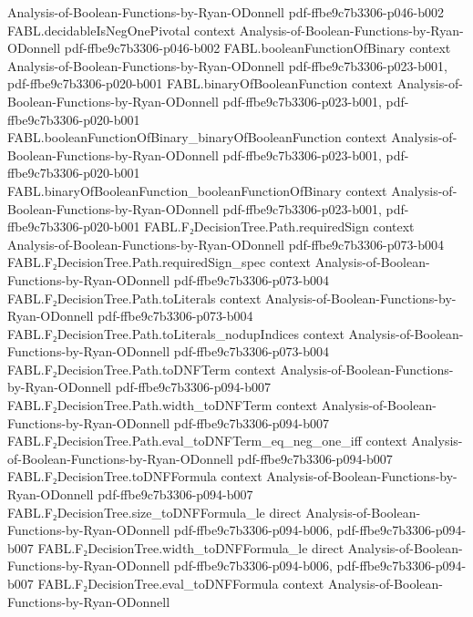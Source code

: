 \begin{theorem}
  {Analysis-of-Boolean-Functions-by-Ryan-ODonnell}
  {pdf-ffbe9c7b3306-p046-b002}
\proofstep
  {FABL.decidableIsNegOnePivotal}
  {context}
  {Analysis-of-Boolean-Functions-by-Ryan-ODonnell}
  {pdf-ffbe9c7b3306-p046-b002}
\proofstep
  {FABL.booleanFunctionOfBinary}
  {context}
  {Analysis-of-Boolean-Functions-by-Ryan-ODonnell}
  {pdf-ffbe9c7b3306-p023-b001,
    pdf-ffbe9c7b3306-p020-b001}
\proofstep
  {FABL.binaryOfBooleanFunction}
  {context}
  {Analysis-of-Boolean-Functions-by-Ryan-ODonnell}
  {pdf-ffbe9c7b3306-p023-b001,
    pdf-ffbe9c7b3306-p020-b001}
\proofstep
  {FABL.booleanFunctionOfBinary_binaryOfBooleanFunction}
  {context}
  {Analysis-of-Boolean-Functions-by-Ryan-ODonnell}
  {pdf-ffbe9c7b3306-p023-b001,
    pdf-ffbe9c7b3306-p020-b001}
\proofstep
  {FABL.binaryOfBooleanFunction_booleanFunctionOfBinary}
  {context}
  {Analysis-of-Boolean-Functions-by-Ryan-ODonnell}
  {pdf-ffbe9c7b3306-p023-b001,
    pdf-ffbe9c7b3306-p020-b001}
\proofstep
  {FABL.F₂DecisionTree.Path.requiredSign}
  {context}
  {Analysis-of-Boolean-Functions-by-Ryan-ODonnell}
  {pdf-ffbe9c7b3306-p073-b004}
\proofstep
  {FABL.F₂DecisionTree.Path.requiredSign_spec}
  {context}
  {Analysis-of-Boolean-Functions-by-Ryan-ODonnell}
  {pdf-ffbe9c7b3306-p073-b004}
\proofstep
  {FABL.F₂DecisionTree.Path.toLiterals}
  {context}
  {Analysis-of-Boolean-Functions-by-Ryan-ODonnell}
  {pdf-ffbe9c7b3306-p073-b004}
\proofstep
  {FABL.F₂DecisionTree.Path.toLiterals_nodupIndices}
  {context}
  {Analysis-of-Boolean-Functions-by-Ryan-ODonnell}
  {pdf-ffbe9c7b3306-p073-b004}
\proofstep
  {FABL.F₂DecisionTree.Path.toDNFTerm}
  {context}
  {Analysis-of-Boolean-Functions-by-Ryan-ODonnell}
  {pdf-ffbe9c7b3306-p094-b007}
\proofstep
  {FABL.F₂DecisionTree.Path.width_toDNFTerm}
  {context}
  {Analysis-of-Boolean-Functions-by-Ryan-ODonnell}
  {pdf-ffbe9c7b3306-p094-b007}
\proofstep
  {FABL.F₂DecisionTree.Path.eval_toDNFTerm_eq_neg_one_iff}
  {context}
  {Analysis-of-Boolean-Functions-by-Ryan-ODonnell}
  {pdf-ffbe9c7b3306-p094-b007}
\proofstep
  {FABL.F₂DecisionTree.toDNFFormula}
  {context}
  {Analysis-of-Boolean-Functions-by-Ryan-ODonnell}
  {pdf-ffbe9c7b3306-p094-b007}
\proofstep
  {FABL.F₂DecisionTree.size_toDNFFormula_le}
  {direct}
  {Analysis-of-Boolean-Functions-by-Ryan-ODonnell}
  {pdf-ffbe9c7b3306-p094-b006,
    pdf-ffbe9c7b3306-p094-b007}
\proofstep
  {FABL.F₂DecisionTree.width_toDNFFormula_le}
  {direct}
  {Analysis-of-Boolean-Functions-by-Ryan-ODonnell}
  {pdf-ffbe9c7b3306-p094-b006,
    pdf-ffbe9c7b3306-p094-b007}
\proofstep
  {FABL.F₂DecisionTree.eval_toDNFFormula}
  {context}
  {Analysis-of-Boolean-Functions-by-Ryan-ODonnell}

\end{theorem}

